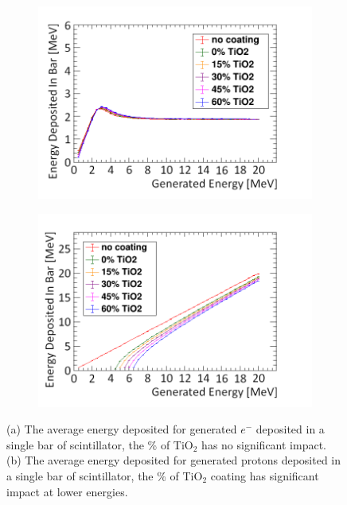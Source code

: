 \begin{figure}[!h]
\centering
\begin{subfigure}{.5\textwidth}
  \centering
  \includegraphics[width=\linewidth]{Chapter4/Figs/Raster/electronEdepTiO2Coating.png}
  \captionsetup{width=.9\linewidth}
  \caption{}
  \label{subFig:proton_TiO2}
\end{subfigure}%
\begin{subfigure}{.5\textwidth}
  \centering
  \includegraphics[width=\linewidth]{Chapter4/Figs/Raster/protonsEdepTiO2Coating.png}
  \captionsetup{width=.9\linewidth}
  \caption{}
  \label{subFig:muon_TiO2}
\end{subfigure}
\caption{(a) The average energy deposited for generated $e^-$ deposited in a single bar of scintillator, the \% of TiO$_2$ has no significant impact. (b) The average energy deposited for generated protons deposited in a single bar of scintillator, the \%  of TiO$_2$ coating has significant impact at lower energies.}
\label{fig:muonProton_TiO2}
\end{figure}


